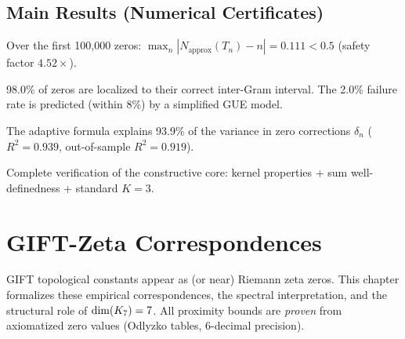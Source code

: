 \section{Main Results (Numerical Certificates)}

\begin{theorem}\label{thm:counting_100}
    Over the first 100{,}000 zeros:
    $\max_n |N_{\text{approx}}(T_n) - n| = 0.111 < 0.5$ (safety factor $4.52\times$).
\end{theorem}

\begin{theorem}\label{thm:localization_98}
    98.0\% of zeros are localized to their correct inter-Gram interval.
    The 2.0\% failure rate is predicted (within 8\%) by a simplified GUE model.
\end{theorem}

\begin{theorem}\label{thm:R2_939}
    The adaptive formula explains 93.9\% of the variance in zero corrections
    $\delta_n$ ($R^2 = 0.939$, out-of-sample $R^2 = 0.919$).
\end{theorem}

\begin{theorem}\label{thm:mollified_sum_cert}
    \leanok
    Complete verification of the constructive core:
    kernel properties + sum well-definedness + standard $K = 3$.
\end{theorem}

\chapter{GIFT-Zeta Correspondences}\label{chap:zeta}

GIFT topological constants appear as (or near) Riemann zeta zeros.
This chapter formalizes these empirical correspondences, the spectral
interpretation, and the structural role of $\mathrm{dim}(K_7) = 7$.
All proximity bounds are \emph{proven} from axiomatized zero values
(Odlyzko tables, 6-decimal precision).

